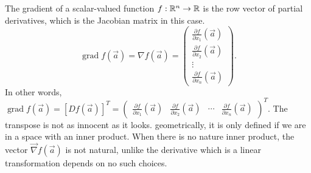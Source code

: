 \begin{remark}
  The gradient of a scalar-valued function $f:\mathbb{R}^n\to\mathbb{R}$ is the row vector of partial derivatives, which is the Jacobian matrix in this case.
  \[
    \operatorname{grad}f(\vec a)=\nabla f(\vec a)=\begin{pmatrix}
    \frac{\partial f}{\partial x_1}(\vec a)\\
    \frac{\partial f}{\partial x_2}(\vec a)\\
    \vdots\\
    \frac{\partial f}{\partial x_n}(\vec a)
    \end{pmatrix}.
  \]
  In other words, $\operatorname{grad}f(\vec a)=[Df(\vec a)]^T=\begin{pmatrix}
    \frac{\partial f}{\partial x_1}(\vec a) & \frac{\partial f}{\partial x_2}(\vec a) & \cdots & \frac{\partial f}{\partial x_n}(\vec a)
  \end{pmatrix}^T$. The transpose is not as innocent as it looks. geometrically, it is only defined if we are in a space with an inner product. When there
  is no nature inner product, the vector $\vec \nabla f(\vec a)$ is not natural, unlike the derivative which is a linear transformation depends on no such choices.    
\end{remark}
